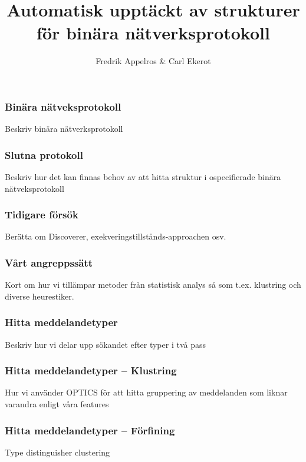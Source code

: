 \documentclass[xetex]{beamer}
\title{Automatisk upptäckt av strukturer för binära nätverksprotokoll}
\author{Fredrik Appelros \& Carl Ekerot}
\date
\begin{document}
    \frame{\titlepage}
    
    \begin{frame}
        \frametitle{Binära nätveksprotokoll}
        Beskriv binära nätverksprotokoll
    \end{frame}
    \begin{frame}
        \frametitle{Slutna protokoll}
        Beskriv hur det kan finnas behov av att hitta struktur i
        ospecifierade binära nätveksprotokoll
    \end{frame}
    \begin{frame}
        \frametitle{Tidigare försök}
        Berätta om Discoverer, exekveringstillstånds-approachen osv.
    \end{frame}

    \begin{frame}
        \frametitle{Vårt angreppssätt}
        Kort om hur vi tillämpar metoder från statistisk analys så
        som t.ex. klustring och diverse heurestiker.
    \end{frame}
    
    \begin{frame}
        \frametitle{Hitta meddelandetyper}
        Beskriv hur vi delar upp sökandet efter typer i två pass
    \end{frame}
    \begin{frame}
        \frametitle{Hitta meddelandetyper -- Klustring}
        Hur vi använder OPTICS för att hitta gruppering av meddelanden som
        liknar varandra enligt våra features
    \end{frame}
    \begin{frame}
        \frametitle{Hitta meddelandetyper -- Förfining}
        Type distinguisher clustering
    \end{frame}
\end{document}
